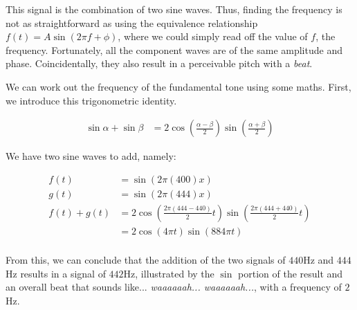 \documentclass{article}
\begin{document}
This signal is the combination of two sine waves. Thus, finding the frequency is not as straightforward as using the equivalence relationship $f(t) = A\sin(2\pi f + \phi)$, where we could simply read off the value of $f$, the frequency. Fortunately, all the component waves are of the same amplitude and phase. Coincidentally, they also result in a perceivable pitch with a \emph{beat}. 


We can work out the frequency of the fundamental tone using some maths. First, we introduce this trigonometric identity.

\begin{align*}
    \sin\alpha + \sin\beta & = 2\cos\left( \frac{\alpha - \beta}{2} \right)\sin\left( \frac{\alpha + \beta}{2} \right)
\end{align*}

We have two sine waves to add, namely:

\begin{align*}
    f(t) & = \sin(2\pi(400) x) \\
    g(t) & = \sin(2\pi(444) x) \\
    f(t) + g(t) & = 2\cos\left( \frac{2\pi(444 - 440)}{2}t \right)\sin\left( \frac{2\pi(444 + 440)}{2}t \right) \\
    & = 2\cos(4\pi t)\sin(884\pi t) \\
\end{align*}

From this, we can conclude that the addition of the two signals of $440$Hz and $444$Hz results in a signal of $442$Hz, illustrated by the $\sin$ portion of the result and an overall beat that sounds like... \emph{waaaaaah... waaaaaah...}, with a frequency of $2$Hz. 
\end{document}
